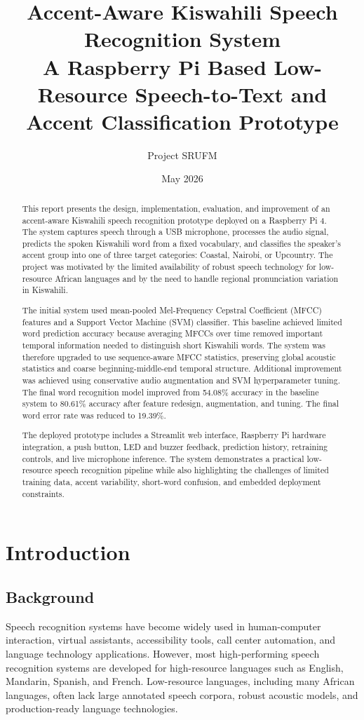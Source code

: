 \documentclass[12pt,a4paper]{report}
\title{
    \textbf{Accent-Aware Kiswahili Speech Recognition System}\\
    \large A Raspberry Pi Based Low-Resource Speech-to-Text and Accent Classification Prototype
}
\author{
    Project SRUFM
}
\date{May 2026}
\begin{document}
\maketitle

\begin{abstract}
This report presents the design, implementation, evaluation, and improvement of an accent-aware Kiswahili speech recognition prototype deployed on a Raspberry Pi 4. The system captures speech through a USB microphone, processes the audio signal, predicts the spoken Kiswahili word from a fixed vocabulary, and classifies the speaker's accent group into one of three target categories: Coastal, Nairobi, or Upcountry. The project was motivated by the limited availability of robust speech technology for low-resource African languages and by the need to handle regional pronunciation variation in Kiswahili.

The initial system used mean-pooled Mel-Frequency Cepstral Coefficient (MFCC) features and a Support Vector Machine (SVM) classifier. This baseline achieved limited word prediction accuracy because averaging MFCCs over time removed important temporal information needed to distinguish short Kiswahili words. The system was therefore upgraded to use sequence-aware MFCC statistics, preserving global acoustic statistics and coarse beginning-middle-end temporal structure. Additional improvement was achieved using conservative audio augmentation and SVM hyperparameter tuning. The final word recognition model improved from 54.08\% accuracy in the baseline system to 80.61\% accuracy after feature redesign, augmentation, and tuning. The final word error rate was reduced to 19.39\%.

The deployed prototype includes a Streamlit web interface, Raspberry Pi hardware integration, a push button, LED and buzzer feedback, prediction history, retraining controls, and live microphone inference. The system demonstrates a practical low-resource speech recognition pipeline while also highlighting the challenges of limited training data, accent variability, short-word confusion, and embedded deployment constraints.
\end{abstract}

\tableofcontents
\listoftables

\chapter{Introduction}

\section{Background}
Speech recognition systems have become widely used in human-computer interaction, virtual assistants, accessibility tools, call center automation, and language technology applications. However, most high-performing speech recognition systems are developed for high-resource languages such as English, Mandarin, Spanish, and French. Low-resource languages, including many African languages, often lack large annotated speech corpora, robust acoustic models, and production-ready language technologies.
\end{document}
